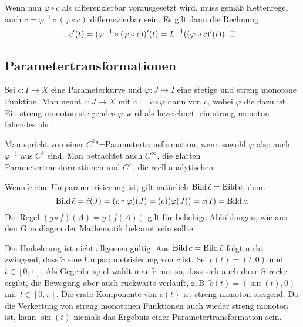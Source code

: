 Wenn nun $\varphi\circ c$ als differenzierbar vorausgesetzt wird,
muss gemäß Kettenregel auch $c=\varphi^{-1}\circ(\varphi\circ c)$
differenzierbar sein. Es gilt dann die Rechnung
\begin{equation}
c'(t) = (\varphi^{-1}\circ(\varphi\circ c))'(t)
= L^{-1}((\varphi\circ c)'(t)).\;\Box
\end{equation}

\pagebreak
\subsection{Parametertransformationen}

\begin{definition}
Sei $c\colon I\to X$ eine Parameterkurve und $\varphi\colon J\to I$
eine stetige und streng monotone Funktion. Man nennt
$\tilde c\colon J\to X$ mit $\tilde c:=c\circ\varphi$ dann
 von $c$, wobei $\varphi$ die
 dazu ist. Ein streng monoton steigendes
$\varphi$ wird als  bezeichnet,
ein strong monoton fallendes als .

Man spricht von einer $C^k$"=Parametertransformation, wenn sowohl
$\varphi$ also auch $\varphi^{-1}$ aus $C^k$ sind. Man betrachtet
auch $C^\infty$, die glatten Parametertransformationen und
$C^\omega$, die reell-analytischen.
\end{definition}

\noindent
Wenn $\tilde c$ eine Umparametrisierung ist, gilt natürlich
$\operatorname{Bild}\tilde c=\operatorname{Bild} c$, denn
\begin{equation}
\operatorname{Bild}\tilde c = \tilde c(J)
= (c\circ\varphi)(J) = (c)(\varphi(J))
= c(I) = \operatorname{Bild} c.
\end{equation}
Die Regel $(g\circ f)(A)=g(f(A))$ gilt für beliebige Abbildungen,
wie aus den Grundlagen der Mathematik bekannt sein sollte.

Die Umkehrung ist nicht allgemeingültig: Aus
$\operatorname{Bild} c=\operatorname{Bild}\tilde c$ folgt nicht zwingend, dass
$\tilde c$ eine Umparametrisierung von $c$ ist. Sei
$c(t)=(t,0)$ und $t\in[0,1]$. Als Gegenbeispiel wählt man
$\tilde c$ nun so, dass sich auch diese Strecke ergibt, die
Bewegung aber auch rückwärts verläuft, z.\,B. $\tilde c(t)=(\sin(t),0)$
mit $t\in[0,\pi]$. Die erste Komponente von $c(t)$ ist streng
monoton steigend. Da die Verkettung von streng monotonen Funktionen
auch wieder streng monoton ist, kann $\sin(t)$ niemals das Ergebnis
einer Parametertransformation sein.

